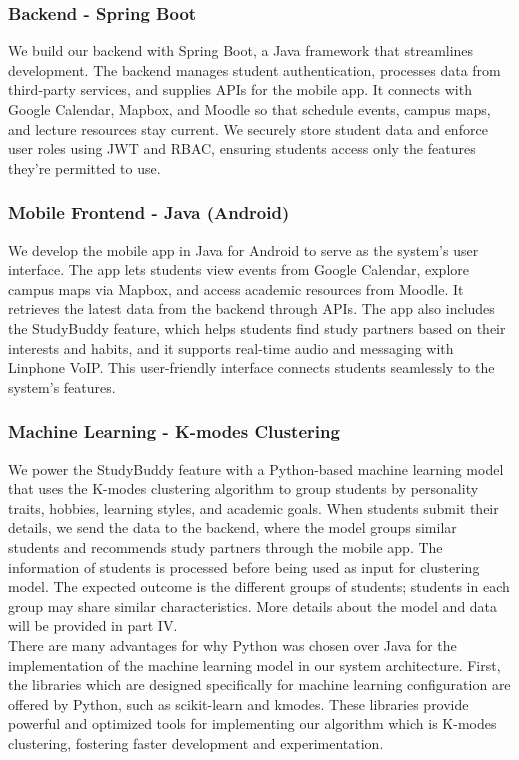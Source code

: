 \documentclass[12pt]{article}
\begin{document}
\pagebreak

\subsubsection{Backend - Spring Boot}
We build our backend with Spring Boot, a Java framework that streamlines development. 
The backend manages student authentication, processes data from third-party services, and supplies APIs for the mobile app. 
It connects with Google Calendar, Mapbox, and Moodle so that schedule events, campus maps, and lecture resources stay current. 
We securely store student data and enforce user roles using JWT and RBAC, ensuring students access only the features they’re permitted to use.

\subsubsection{Mobile Frontend - Java (Android)}
We develop the mobile app in Java for Android to serve as the system’s user interface. 
The app lets students view events from Google Calendar, explore campus maps via Mapbox, and access academic resources from Moodle. 
It retrieves the latest data from the backend through APIs. 
The app also includes the StudyBuddy feature, which helps students find study partners based on their interests and habits, and it supports real-time audio and messaging with Linphone VoIP. 
This user-friendly interface connects students seamlessly to the system’s features.

\subsubsection{Machine Learning - K-modes Clustering}
We power the StudyBuddy feature with a Python-based machine learning model that uses the K-modes clustering algorithm to group students by personality traits, hobbies, learning styles, and academic goals. 
When students submit their details, we send the data to the backend, where the model groups similar students and recommends study partners through the mobile app.
The information of students is processed before being used as input for clustering model. The expected outcome is the different groups of students; students in each group may share similar characteristics. More details about the model and data will be provided in part IV. \\

There are many advantages for why Python was chosen over Java for the implementation of the machine learning model in our system architecture. First, the libraries which are designed specifically for machine learning configuration are offered by Python, such as scikit-learn and kmodes. These libraries provide powerful and optimized tools for implementing our algorithm which is K-modes clustering, fostering faster development and experimentation. \\
\end{document}
